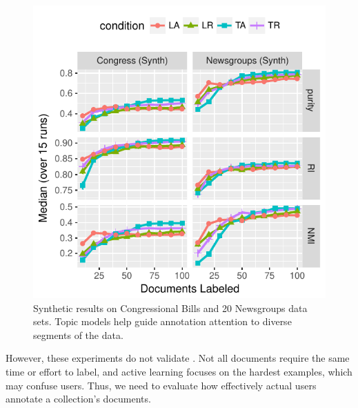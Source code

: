 \begin{figure}[t!]
\includegraphics[width=\linewidth]{2016_acl_doclabel/auto_fig/synthetic}
\caption{Synthetic results on  Congressional
  Bills and 20 Newsgroups data sets.  Topic models help guide annotation
  attention to diverse segments of the data.}
\label{fig:syn_results}
\end{figure}

However, these experiments do not validate \name{}.  Not all documents
require the same time or effort to label, and active learning focuses
on the hardest examples, which may confuse users.  Thus, we need to
evaluate how effectively actual users annotate a collection's
documents.
